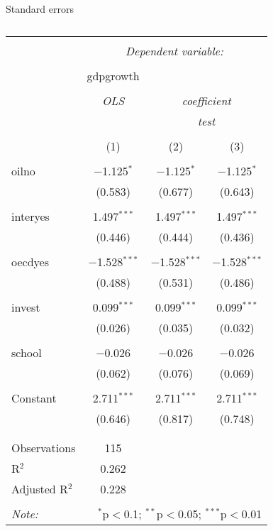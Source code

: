 \documentclass[
  10pt,
  ignorenonframetext,
]{beamer}
\begin{document}
\begin{frame}{Standard errors}
\protect\hypertarget{standard-errors-1}{}

\def\arraystretch{0.7}

\begin{table}[!htbp] \centering 
  \caption{} 
  \label{} 
\scriptsize 
\begin{tabular}{@{\extracolsep{0pt}}lccc} 
\\[-1.8ex]\hline 
\hline \\[-1.8ex] 
 & \multicolumn{3}{c}{\textit{Dependent variable:}} \\ 
\cline{2-4} 
\\[-1.8ex] & gdpgrowth & \multicolumn{2}{c}{ } \\ 
\\[-1.8ex] & \textit{OLS} & \multicolumn{2}{c}{\textit{coefficient}} \\ 
 & \textit{} & \multicolumn{2}{c}{\textit{test}} \\ 
\\[-1.8ex] & (1) & (2) & (3)\\ 
\hline \\[-1.8ex] 
 oilno & $-$1.125$^{*}$ & $-$1.125$^{*}$ & $-$1.125$^{*}$ \\ 
  & (0.583) & (0.677) & (0.643) \\ 
  & & & \\ 
 interyes & 1.497$^{***}$ & 1.497$^{***}$ & 1.497$^{***}$ \\ 
  & (0.446) & (0.444) & (0.436) \\ 
  & & & \\ 
 oecdyes & $-$1.528$^{***}$ & $-$1.528$^{***}$ & $-$1.528$^{***}$ \\ 
  & (0.488) & (0.531) & (0.486) \\ 
  & & & \\ 
 invest & 0.099$^{***}$ & 0.099$^{***}$ & 0.099$^{***}$ \\ 
  & (0.026) & (0.035) & (0.032) \\ 
  & & & \\ 
 school & $-$0.026 & $-$0.026 & $-$0.026 \\ 
  & (0.062) & (0.076) & (0.069) \\ 
  & & & \\ 
 Constant & 2.711$^{***}$ & 2.711$^{***}$ & 2.711$^{***}$ \\ 
  & (0.646) & (0.817) & (0.748) \\ 
  & & & \\ 
\hline \\[-1.8ex] 
Observations & 115 &  &  \\ 
R$^{2}$ & 0.262 &  &  \\ 
Adjusted R$^{2}$ & 0.228 &  &  \\ 
\hline 
\hline \\[-1.8ex] 
\textit{Note:}  & \multicolumn{3}{r}{$^{*}$p$<$0.1; $^{**}$p$<$0.05; $^{***}$p$<$0.01} \\ 
\end{tabular} 
\end{table}

\end{frame}
\end{document}
